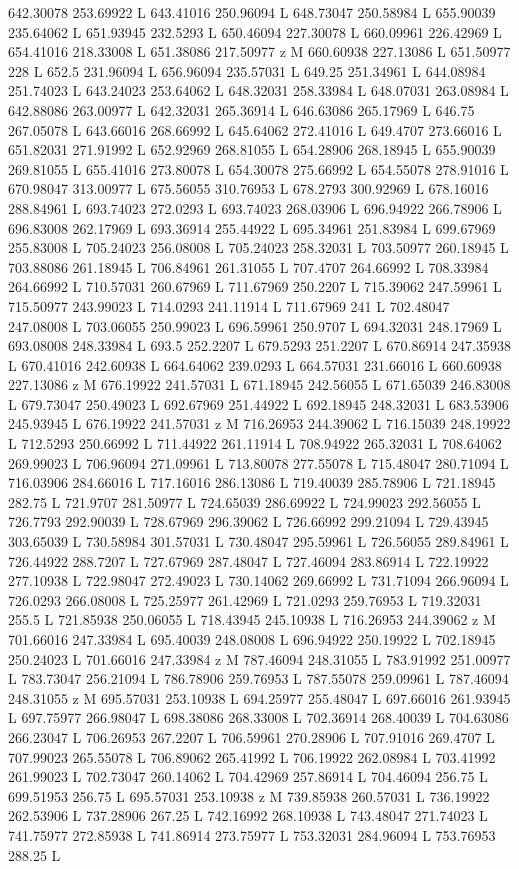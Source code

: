 {\begin{scope}[local bounding box=bb]
{642.30078 253.69922 L 643.41016 250.96094 L 648.73047 250.58984 L 655.90039 235.64062 L 651.93945 232.5293 L 650.46094 227.30078 L 660.09961 226.42969 L 654.41016 218.33008 L 651.38086 217.50977 z M 660.60938 227.13086 L 651.50977 228 L 652.5 231.96094 L 656.96094 235.57031 L 649.25 251.34961 L 644.08984 251.74023 L 643.24023 253.64062 L 648.32031 258.33984 L 648.07031 263.08984 L 642.88086 263.00977 L 642.32031 265.36914 L 646.63086 265.17969 L 646.75 267.05078 L 643.66016 268.66992 L 645.64062 272.41016 L 649.4707 273.66016 L 651.82031 271.91992 L 652.92969 268.81055 L 654.28906 268.18945 L 655.90039 269.81055 L 655.41016 273.80078 L 654.30078 275.66992 L 654.55078 278.91016 L 670.98047 313.00977 L 675.56055 310.76953 L 678.2793 300.92969 L 678.16016 288.84961 L 693.74023 272.0293 L 693.74023 268.03906 L 696.94922 266.78906 L 696.83008 262.17969 L 693.36914 255.44922 L 695.34961 251.83984 L 699.67969 255.83008 L 705.24023 256.08008 L 705.24023 258.32031 L 703.50977 260.18945 L 703.88086 261.18945 L 706.84961 261.31055 L 707.4707 264.66992 L 708.33984 264.66992 L 710.57031 260.67969 L 711.67969 250.2207 L 715.39062 247.59961 L 715.50977 243.99023 L 714.0293 241.11914 L 711.67969 241 L 702.48047 247.08008 L 703.06055 250.99023 L 696.59961 250.9707 L 694.32031 248.17969 L 693.08008 248.33984 L 693.5 252.2207 L 679.5293 251.2207 L 670.86914 247.35938 L 670.41016 242.60938 L 664.64062 239.0293 L 664.57031 231.66016 L 660.60938 227.13086 z M 676.19922 241.57031 L 671.18945 242.56055 L 671.65039 246.83008 L 679.73047 250.49023 L 692.67969 251.44922 L 692.18945 248.32031 L 683.53906 245.93945 L 676.19922 241.57031 z M 716.26953 244.39062 L 716.15039 248.19922 L 712.5293 250.66992 L 711.44922 261.11914 L 708.94922 265.32031 L 708.64062 269.99023 L 706.96094 271.09961 L 713.80078 277.55078 L 715.48047 280.71094 L 716.03906 284.66016 L 717.16016 286.13086 L 719.40039 285.78906 L 721.18945 282.75 L 721.9707 281.50977 L 724.65039 286.69922 L 724.99023 292.56055 L 726.7793 292.90039 L 728.67969 296.39062 L 726.66992 299.21094 L 729.43945 303.65039 L 730.58984 301.57031 L 730.48047 295.59961 L 726.56055 289.84961 L 726.44922 288.7207 L 727.67969 287.48047 L 727.46094 283.86914 L 722.19922 277.10938 L 722.98047 272.49023 L 730.14062 269.66992 L 731.71094 266.96094 L 726.0293 266.08008 L 725.25977 261.42969 L 721.0293 259.76953 L 719.32031 255.5 L 721.85938 250.06055 L 718.43945 245.10938 L 716.26953 244.39062 z M 701.66016 247.33984 L 695.40039 248.08008 L 696.94922 250.19922 L 702.18945 250.24023 L 701.66016 247.33984 z M 787.46094 248.31055 L 783.91992 251.00977 L 783.73047 256.21094 L 786.78906 259.76953 L 787.55078 259.09961 L 787.46094 248.31055 z M 695.57031 253.10938 L 694.25977 255.48047 L 697.66016 261.93945 L 697.75977 266.98047 L 698.38086 268.33008 L 702.36914 268.40039 L 704.63086 266.23047 L 706.26953 267.2207 L 706.59961 270.28906 L 707.91016 269.4707 L 707.99023 265.55078 L 706.89062 265.41992 L 706.19922 262.08984 L 703.41992 261.99023 L 702.73047 260.14062 L 704.42969 257.86914 L 704.46094 256.75 L 699.51953 256.75 L 695.57031 253.10938 z M 739.85938 260.57031 L 736.19922 262.53906 L 737.28906 267.25 L 742.16992 268.10938 L 743.48047 271.74023 L 741.75977 272.85938 L 741.86914 273.75977 L 753.32031 284.96094 L 753.76953 288.25 L }
\end{scope}}
